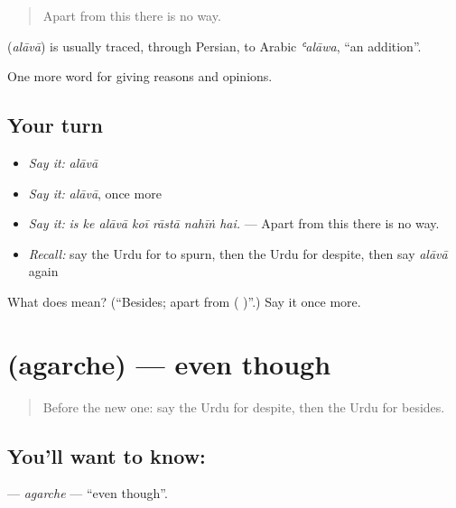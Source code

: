 \begin{quote}
Apart from this there is no way.
\end{quote}

\begin{cousinweb}
\textbf{} (\emph{alāvā}) is usually traced, through Persian, to Arabic \emph{ʿalāwa}, \textquotedblleft{}an addition\textquotedblright{}.
\end{cousinweb}

\begin{grammarlens}[title={What you've built}]
One more word for giving reasons and opinions.
\end{grammarlens}

\subsection*{Your turn}
\begin{itemize}
\raggedright
  \item \emph{Say it:} \emph{alāvā}
  \item \emph{Say it:} \emph{alāvā}, once more
  \item \emph{Say it:} \emph{is ke alāvā koī rāstā nahīṅ hai.} — Apart from this there is no way.
  \item \emph{Recall:} say the Urdu for to spurn, then the Urdu for despite, then say \emph{alāvā} again
\end{itemize}

\begin{tcolorbox}[breakable,colback=teal!4,colframe=teal!35!black,title={Before you move on}]
What does  mean? (\textquotedblleft{}Besides; apart from ( )\textquotedblright{}.) Say it once more.
\end{tcolorbox}
\section[\texorpdfstring{\ur{اگرچہ} (agarche)}{اگرچہ (agarche)}]{ (agarche) — even though}

\label{lesson:UR-C359-agarche}



\begin{quote}
Before the new one: say the Urdu for despite, then the Urdu for besides.
\end{quote}

\subsection*{You'll want to know: }
\textbf{} — \emph{agarche} — \textquotedblleft{}even though\textquotedblright{}.

